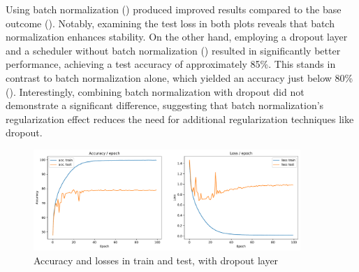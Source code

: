 Using batch normalization () produced improved results compared to the base outcome (). Notably, examining the test loss in both plots reveals that batch normalization enhances stability. On the other hand, employing a dropout layer and a scheduler without batch normalization () resulted in significantly better performance, achieving a test accuracy of approximately 85\%. This stands in contrast to batch normalization alone, which yielded an accuracy just below 80\% (). Interestingly, combining batch normalization with dropout did not demonstrate a significant difference, suggesting that batch normalization's regularization effect reduces the need for additional regularization techniques like dropout.





\begin{figure}[H]
    \centering
    \includegraphics*[width=0.9\textwidth]{figs/CNN/batchnorm_with_dropout.pdf}
    \caption{Accuracy and losses in train and test, with dropout layer}
    \label{fig:batchnorm_with_dropout}
\end{figure}


